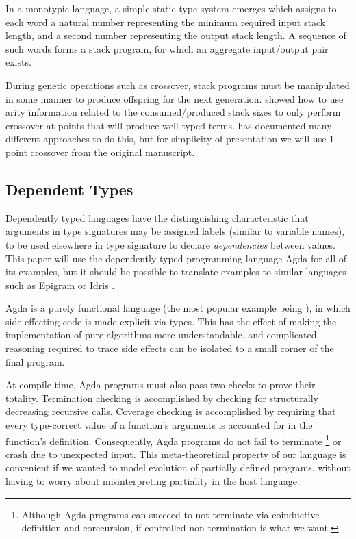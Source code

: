 \documentclass{acm_proc_article-sp}
\begin{document}
In a monotypic language, a simple static type system emerges which
assigns to each word a natural number representing the minimum required input
stack length, and a second number representing the output stack
length. A sequence of such words forms a stack program, for which an
aggregate input/output pair exists.

During genetic operations such as crossover, stack programs must be
manipulated in some manner to produce offspring for the next
generation. \cite{tchernev:forthcross} showed how to use arity
information related to the consumed/produced stack sizes to only
perform crossover at points that will produce well-typed
terms. \cite{tchernev:crossmethods} has documented many different
approaches to do this, but for simplicity of presentation we will use
1-point crossover from the original manuscript.

\subsection{Dependent Types}

Dependently typed languages have the distinguishing characteristic
that arguments in type signatures may be assigned labels (similar to
variable names), to be used elsewhere in type signature to declare
\textit{dependencies} between values. This paper will use the
dependently typed programming language Agda \cite{norell:agdatut} for
all of its examples, but it should be possible to translate examples
to similar languages such as Epigram \cite{to:do} or Idris
\cite{to:do}.

Agda is a purely functional language (the most popular example being
\cite{spj:haskell}), in which side effecting code is made explicit via
types. This has the effect of making the implementation of pure algorithms
more understandable, and complicated reasoning required to trace side
effects can be isolated to a small corner of the final program.

At compile time, Agda programs must also pass two checks to prove their
totality. Termination checking is accomplished by checking
for structurally decreasing recursive calls. Coverage checking is
accomplished by requiring that every type-correct value of a function's
arguments is accounted for in the function's definition.
Consequently, Agda programs do not fail to terminate
\footnote{Although Agda programs can succeed to not terminate via
  coinductive definition and corecursion, if controlled
  non-termination is what we want.}
or crash due to unexpected input. This meta-theoretical property of
our language is convenient if we wanted to model evolution of
partially defined programs, without having to worry about
misinterpreting partiality in the host language.
\end{document}
